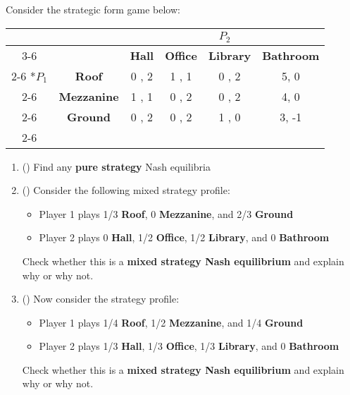 \begin{question}[type=exam]{16}

Consider the strategic form game below: 

\begin{table}[!h]
  \begin{center}
    \begin{tabular}{*{6}{c|}}
      \multicolumn{2}{c}{} & \multicolumn{4}{c}{$P_2$} \\ \cline{3-6}
      \multicolumn{1}{c}{} &  & \textbf{Hall} & \textbf{Office} & \textbf{Library} & \textbf{Bathroom} \\ \cline{2-6} 
      \multirow{4}*{$P_1$}
      & \textbf{Roof}      & 0 , 2 & 1 , 1 & 0 , 2 & 5, 0 \\ \cline{2-6}
      & \textbf{Mezzanine} & 1 , 1 & 0 , 2 & 0 , 2 & 4, 0 \\ \cline{2-6}
      & \textbf{Ground}    & 0 , 2 & 0 , 2 & 1 , 0 & 3, -1\\ \cline{2-6} 
    \end{tabular}
  \end{center}
\end{table}

\begin{enumerate}[label=\Alph*)]
  \item ()
  Find any \textbf{pure strategy} Nash equilibria
  \vspace{3cm}

  \item ()
  Consider the following mixed strategy profile: 
  \begin{itemize}
    \item Player 1 plays 1/3 \textbf{Roof}, 0 \textbf{Mezzanine}, and 2/3 \textbf{Ground}
    \item Player 2 plays 0 \textbf{Hall}, 1/2 \textbf{Office}, 1/2 \textbf{Library}, and 0 \textbf{Bathroom}
  \end{itemize}
  Check whether this is a \textbf{mixed strategy Nash equilibrium} and explain why or why not. 
  \vspace{5cm}

  \item ()
  Now consider the strategy profile:
  \begin{itemize}
    \item Player 1 plays 1/4 \textbf{Roof}, 1/2 \textbf{Mezzanine}, and 1/4 \textbf{Ground}
    \item Player 2 plays 1/3 \textbf{Hall}, 1/3 \textbf{Office}, 1/3 \textbf{Library}, and 0 \textbf{Bathroom}
  \end{itemize}
  Check whether this is a \textbf{mixed strategy Nash equilibrium} and explain why or why not.
  \vspace{5cm}

\end{enumerate}

\end{question}

